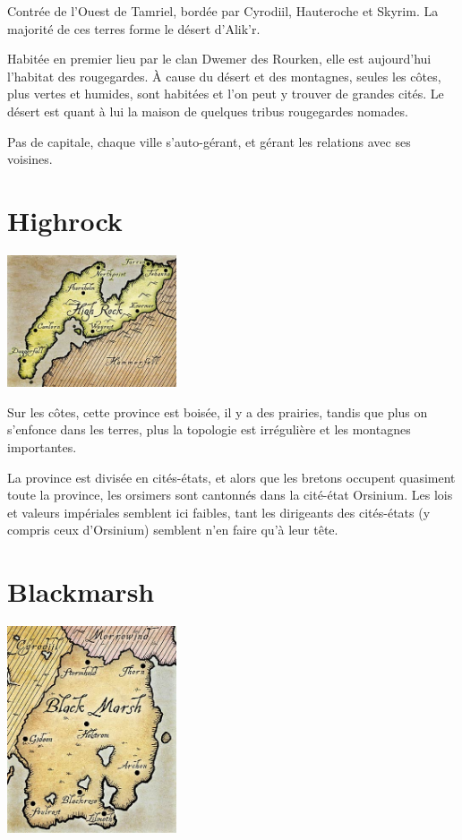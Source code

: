 Contrée de l'Ouest de Tamriel, bordée par Cyrodiil, Hauteroche et Skyrim. La majorité de ces terres forme le désert d'Alik'r. 

Habitée en premier lieu par le clan Dwemer des Rourken, elle est aujourd'hui l'habitat des rougegardes. À cause du désert et des montagnes, seules les côtes, plus vertes et humides, sont habitées et l'on peut y trouver de grandes cités. Le désert est quant à lui la maison de quelques tribus rougegardes nomades.

Pas de capitale, chaque ville s'auto-gérant, et gérant les relations avec ses voisines.

\section{Highrock}

\begin{center}
\includegraphics[width=5cm]{images/map_highrock.jpg}
\end{center}

Sur les côtes, cette province est boisée, il y a des prairies, tandis que plus on s'enfonce dans les terres, plus la topologie est irrégulière et les montagnes importantes.

La province est divisée en cités-états, et alors que les bretons occupent quasiment toute la province, les orsimers sont cantonnés dans la cité-état Orsinium. Les lois et valeurs impériales semblent ici faibles, tant les dirigeants des cités-états (y compris ceux d'Orsinium) semblent n'en faire qu'à leur tête.

\section{Blackmarsh}

\begin{center}
\includegraphics[width=5cm]{images/map_blackmarsh.jpg}
\end{center}

